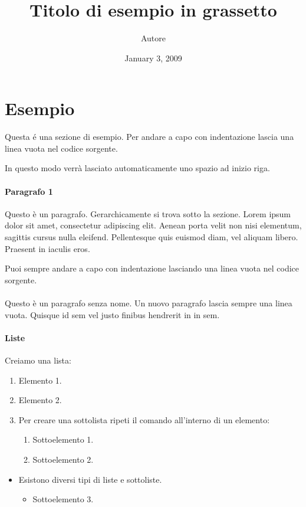 \documentclass{article}
\title{\textbf{Titolo di esempio in grassetto}}
\author{Autore}
\affil{Tradotto e curato da xxxxx}
\date{January 3, 2009}
\begin{document}
\maketitle
\section{Esempio} Questa é una sezione di esempio. Per andare a capo con indentazione lascia una linea vuota nel codice sorgente.

In questo modo verrà lasciato automaticamente uno spazio ad inizio riga.   

\paragraph{Paragrafo 1} Questo è un paragrafo. Gerarchicamente si trova sotto la sezione. Lorem ipsum dolor sit amet, consectetur adipiscing elit. Aenean porta velit non nisi elementum, sagittis cursus nulla eleifend. Pellentesque quis euismod diam, vel aliquam libero. Praesent in iaculis eros.

Puoi sempre andare a capo con indentazione lasciando una linea vuota nel codice sorgente.

\paragraph{} Questo è un paragrafo senza nome. Un nuovo paragrafo lascia sempre una linea vuota. Quisque id sem vel justo finibus hendrerit in in sem.
\paragraph{Liste} Creiamo una lista:
\begin{enumerate}
    \item Elemento 1.
    \item Elemento 2.
    \item Per creare una sottolista ripeti il comando all'interno di un elemento:
    \begin{enumerate}
        \item Sottoelemento 1.
        \item Sottoelemento 2.
    \end{enumerate}
\end{enumerate}
\begin{itemize}
    \item Esistono diversi tipi di liste e sottoliste.
    \begin{itemize}
        \item Sottoelemento 3.
    \end{itemize}
\end{itemize}
\end{document}
